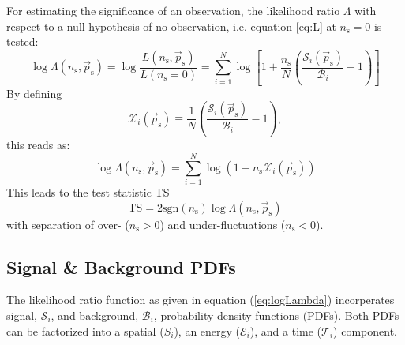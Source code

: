 \documentclass{article}
\newcommand{\eq}[1]{(\ref{#1})}
\newcommand{\ns}{n_{\mathrm{s}}}
\newcommand{\ps}{\vec{p}_{\mathrm{s}}}
\begin{document}
For estimating the significance of an observation, the likelihood ratio
$\Lambda$ with respect to a null hypothesis of no observation, i.e.
equation \ref{eq:L} at $\ns=0$ is tested:
\begin{equation}
 \log \Lambda(\ns,\ps) = \log \frac{L(\ns,\ps)}{L(\ns=0)} = \sum_{i=1}^{N} \log \left[ 1 + \frac{\ns}{N}\left( \frac{\mathcal{S}_i(\ps)}{\mathcal{B}_i} - 1 \right) \right]
\label{eq:logLambda}
\end{equation}
By defining
\begin{equation}
\mathcal{X}_i(\ps) \equiv \frac{1}{N}\left( \frac{\mathcal{S}_i(\ps)}{\mathcal{B}_i} - 1 \right),
\label{eq:Xi}
\end{equation}
this reads as:
\begin{equation}
 \log \Lambda(\ns,\ps) = \sum_{i=1}^{N} \log (1 + \ns\mathcal{X}_i(\ps))
 \label{eq:logLambdaOfX}
\end{equation}
This leads to the test statistic TS
\begin{equation}
 \mathrm{TS} = 2\mathrm{sgn}(\ns) \log \Lambda(\ns,\ps)
 \label{eq:TS}
\end{equation}
with separation of over- ($\ns > 0$) and under-fluctuations ($\ns < 0$).

\subsection{Signal \& Background PDFs}

The likelihood ratio function as given in equation \eq{eq:logLambda}
incorperates signal, $\mathcal{S}_i$, and background, $\mathcal{B}_i$,
probability density functions (PDFs). Both PDFs can be factorized into a
spatial ($S_i$), an energy ($\mathcal{E}_i$), and a time ($\mathcal{T}_i$)
component.
\end{document}
